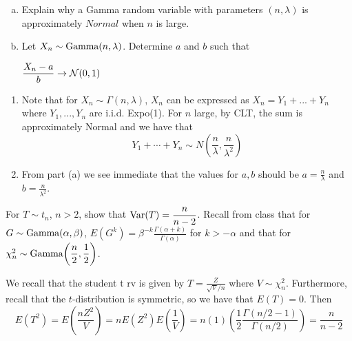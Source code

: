\documentclass[11pt]{article}
\begin{document}
{\begin{exercise}
\begin{enumerate}[a)]
  \item Explain why a Gamma random variable with parameters $(n, \lambda)$ is approximately $Normal$ when $n$ is large.
  \item Let $X_n \sim \textrm{Gamma}(n, \lambda)$. Determine $a$ and $b$ such that
  \begin{center}
  $\displaystyle \frac{X_n - a}{b} \rightarrow \mathcal{N}(0,1)$
  \end{center}
\end{enumerate}
\end{exercise}

\begin{solution}
\begin{enumerate}
\item
Note that for $X_n \sim \Gamma(n, \lambda)$, $X_n$ can be expressed as $X_n = Y_1 + ... + Y_n$ where $Y_1 , ..., Y_n$ are
i.i.d. Expo(1). For $n$ large, by CLT, the sum is approximately Normal and we have that
$$
Y_1 + \cdots + Y_n \sim N(\frac{n}{\lambda}, \frac{n}{\lambda^2})
$$
\item From part (a) we see immediate that the values for $a,b$ should be $a = \frac{n}{\lambda}$ and $b = \frac{n}{\lambda^2}$.
\end{enumerate}
\end{solution}

\begin{exercise}
For $T \sim t_n$, $n>2$, show that $\textrm{Var}(T) = \displaystyle\frac{n}{n-2}$. Recall from class that for $G\sim \textrm{Gamma}(\alpha, \beta)$, $E(G^k) = \displaystyle\beta^{-k}\frac{\Gamma(\alpha+k)}{\Gamma(\alpha)}$ for $k > -\alpha$ and that for $\chi^2_n \sim \displaystyle\textrm{Gamma}\bigg{(}\frac{n}{2},\frac{1}{2}\bigg{)}$.
\end{exercise}

\begin{solution}
We recall that the student t rv is given by $T = \frac{Z}{\sqrt{V}/n}$ where $V \sim \chi_n^2$. Furthermore, recall that the $t$-distribution is symmetric, so we have that $E(T) = 0$. Then
$$
E(T^2) = E(\frac{nZ^2}{V}) = nE(Z^2)E(\frac{1}{V}) = n(1)(\frac{1}{2}\frac{\Gamma(n/2 - 1)}{\Gamma(n/2)}) = \frac{n}{n - 2}
$$
\end{solution}

}
\end{document}
